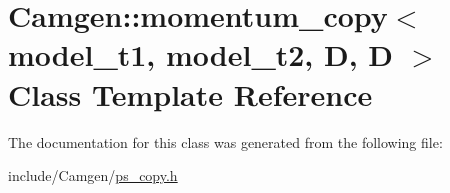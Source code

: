 \hypertarget{a00378}{}\section{Camgen\+:\+:momentum\+\_\+copy$<$ model\+\_\+t1, model\+\_\+t2, D, D $>$ Class Template Reference}
\label{a00378}


The documentation for this class was generated from the following file\+:\begin{DoxyCompactItemize}
\item 
include/\+Camgen/\hyperlink{a00740}{ps\+\_\+copy.\+h}\end{DoxyCompactItemize}
